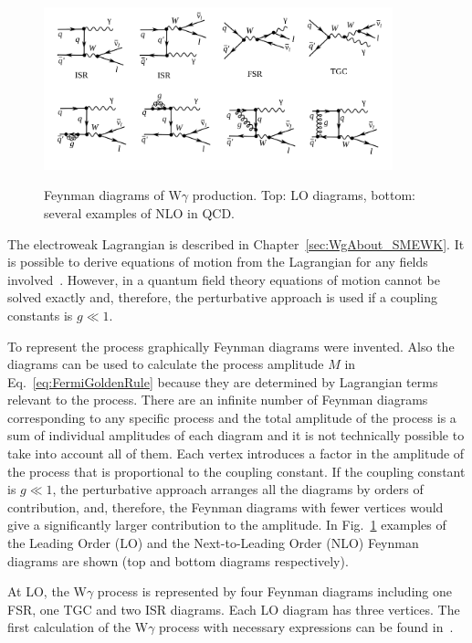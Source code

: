 \begin{figure}[htb]
  \begin{center}
    {\includegraphics[width=0.90\textwidth]{../figs/WgAbout/feynmWg_LO_NLO.png}}
    \caption{Feynman diagrams of W$\gamma$ production. Top: LO diagrams, bottom: several examples of NLO in QCD.}
    \label{fig:feynmWg_LO_NLO}
  \end{center}
\end{figure}

The electroweak Lagrangian is described in Chapter~\ref{sec:WgAbout_SMEWK}. It is possible to derive equations of motion from the Lagrangian for any fields involved~\cite{ref_Griffiths}. However, in a quantum field theory equations of motion cannot be solved exactly and, therefore, the perturbative approach is used if a coupling constants is $g \ll 1$.

To represent the process graphically Feynman diagrams were invented. Also the diagrams can be used to calculate the process amplitude $M$ in Eq.~\ref{eq:FermiGoldenRule} because they are determined by Lagrangian terms relevant to the process. There are an infinite number of Feynman diagrams corresponding to any specific process and the total amplitude of the process is a sum of individual amplitudes of each diagram and it is not technically possible to take into account all of them. Each vertex introduces a factor in the amplitude of the process that is proportional to the coupling constant. If the coupling constant is $g \ll 1$, the perturbative approach arranges all the diagrams by orders of contribution, and, therefore, the Feynman diagrams with fewer vertices would give a significantly larger contribution to the amplitude. In Fig.~\ref{fig:feynmWg_LO_NLO} examples of the Leading Order (LO) and the Next-to-Leading Order (NLO) Feynman diagrams are shown (top and bottom diagrams respectively).

At LO, the W$\gamma$ process is represented by four Feynman diagrams including one FSR, one TGC and two ISR diagrams. Each LO diagram has three vertices. The first calculation of the W$\gamma$ process with necessary expressions can be found in~\cite{ref_theory_LO}.

